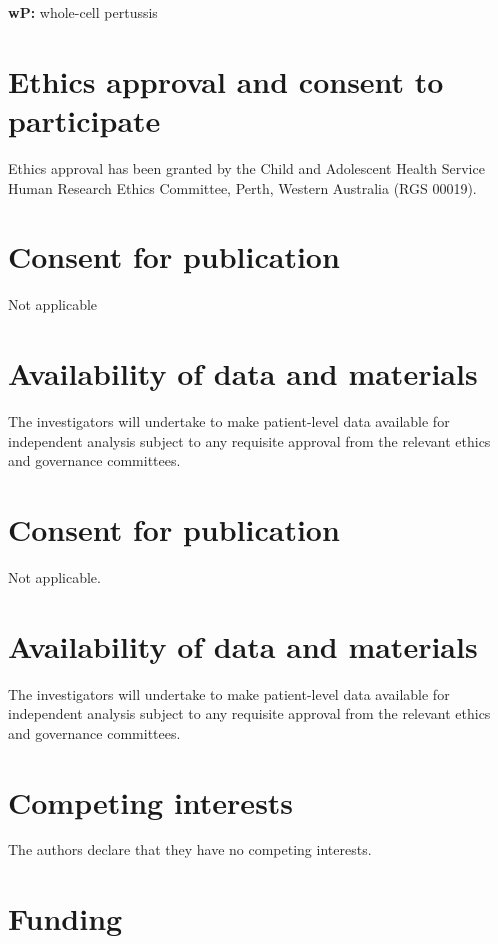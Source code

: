 \documentclass{bmcart}
\begin{document}
\begin{backmatter}
\textbf{wP:} whole-cell pertussis

\section*{Ethics approval and consent to participate}%

Ethics approval has been granted by the Child and Adolescent Health Service Human Research Ethics Committee, Perth, Western Australia (RGS 00019).

\section*{Consent for publication}

Not applicable

\section*{Availability of data and materials}%

The investigators will undertake to make patient-level data available for independent analysis subject to any requisite approval from the relevant ethics and governance committees.

\section*{Consent for publication}

Not applicable.

\section*{Availability of data and materials}%

The investigators will undertake to make patient-level data available for independent analysis subject to any requisite approval from the relevant ethics and governance committees.

\section*{Competing interests}

The authors declare that they have no competing interests.

\section*{Funding}


\end{backmatter}
\end{document}

